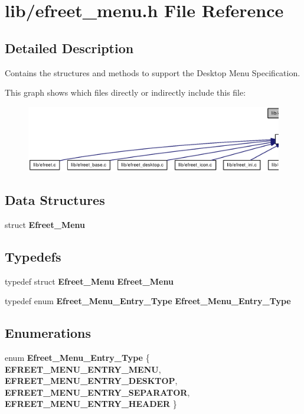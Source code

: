 \section{lib/efreet\_\-menu.h File Reference}
\label{efreet__menu_8h}


\subsection{Detailed Description}
Contains the structures and methods to support the Desktop Menu Specification. 





This graph shows which files directly or indirectly include this file:\nopagebreak
\begin{figure}[H]
\begin{center}
\leavevmode
\includegraphics[width=420pt]{efreet__menu_8h__dep__incl}
\end{center}
\end{figure}
\subsection*{Data Structures}
\begin{CompactItemize}
\item 
struct {\bf Efreet\_\-Menu}
\end{CompactItemize}
\subsection*{Typedefs}
\begin{CompactItemize}
\item 
typedef struct {\bf Efreet\_\-Menu} {\bf Efreet\_\-Menu}
\item 
typedef enum {\bf Efreet\_\-Menu\_\-Entry\_\-Type} {\bf Efreet\_\-Menu\_\-Entry\_\-Type}
\end{CompactItemize}
\subsection*{Enumerations}
\begin{CompactItemize}
\item 
enum {\bf Efreet\_\-Menu\_\-Entry\_\-Type} \{ {\bf EFREET\_\-MENU\_\-ENTRY\_\-MENU}, 
{\bf EFREET\_\-MENU\_\-ENTRY\_\-DESKTOP}, 
{\bf EFREET\_\-MENU\_\-ENTRY\_\-SEPARATOR}, 
{\bf EFREET\_\-MENU\_\-ENTRY\_\-HEADER}
 \}
\end{CompactItemize}
